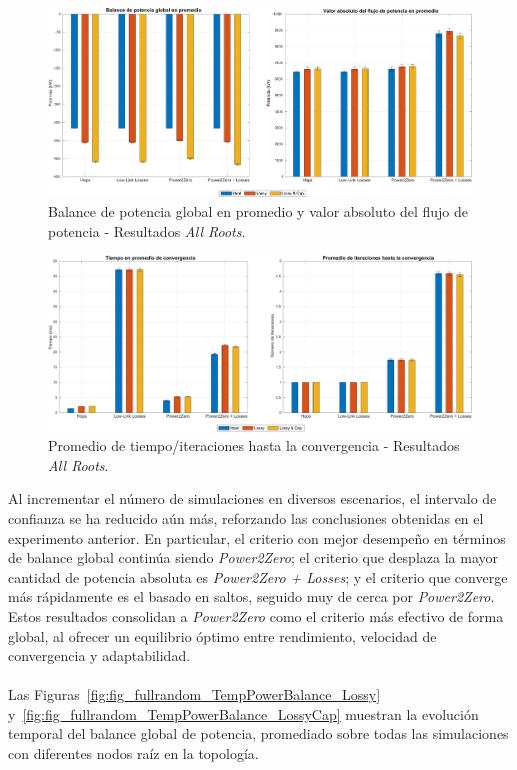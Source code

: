 \begin{figure}[ht!]
    \centering
    \includegraphics[width=\textwidth]{fig/07_bloste/bloste_12.pdf}
    \caption{Balance de potencia global en promedio y valor absoluto del flujo de potencia - Resultados \textit{All Roots}.}
    \label{fig:fig_fullrandom_global_powers}
\end{figure}

\begin{figure}[ht!]
    \centering
    \includegraphics[width=\textwidth]{fig/07_bloste/bloste_13.pdf}
    \caption{Promedio de tiempo/iteraciones hasta la convergencia - Resultados \textit{All Roots}.}
    \label{fig:fig_fullrandom_global_time_iter}
\end{figure}

Al incrementar el número de simulaciones en diversos escenarios, el intervalo de confianza se ha reducido aún más, reforzando las conclusiones obtenidas en el experimento anterior. En particular, el criterio con mejor desempeño en términos de balance global continúa siendo \textit{Power2Zero}; el criterio que desplaza la mayor cantidad de potencia absoluta es \textit{Power2Zero + Losses}; y el criterio que converge más rápidamente es el basado en saltos, seguido muy de cerca por \textit{Power2Zero}. Estos resultados consolidan a \textit{Power2Zero} como el criterio más efectivo de forma global, al ofrecer un equilibrio óptimo entre rendimiento, velocidad de convergencia y adaptabilidad.\\
\\
Las Figuras~\ref{fig:fig_fullrandom_TempPowerBalance_Lossy} y~\ref{fig:fig_fullrandom_TempPowerBalance_LossyCap} muestran la evolución temporal del balance global de potencia, promediado sobre todas las simulaciones con diferentes nodos raíz en la topología.


